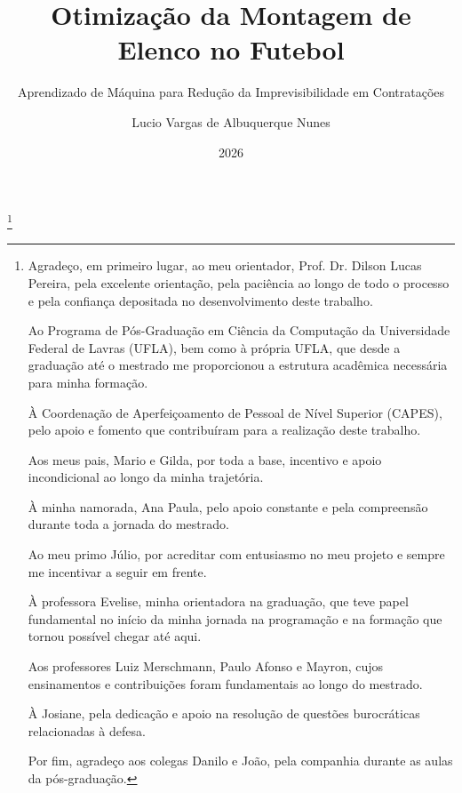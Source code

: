 \documentclass{uflamon}          %
\author{Lucio Vargas de Albuquerque Nunes}
\title{Otimização da Montagem de Elenco no Futebol}
\subtitle{Aprendizado de Máquina para Redução da Imprevisibilidade em Contratações}
\date{2026}
\begin{document}
\maketitle


\thanks{Agradeço, em primeiro lugar, ao meu orientador, Prof. Dr. Dilson Lucas Pereira, pela excelente orientação, pela paciência ao longo de todo o processo e 
pela confiança depositada no desenvolvimento deste trabalho.

Ao Programa de Pós-Graduação em Ciência da Computação da Universidade Federal de Lavras (UFLA), bem como à própria UFLA, que desde a graduação 
até o mestrado me proporcionou a estrutura acadêmica necessária para minha formação.

À Coordenação de Aperfeiçoamento de Pessoal de Nível Superior (CAPES), pelo apoio e fomento que contribuíram para a realização deste trabalho.

Aos meus pais, Mario e Gilda, por toda a base, incentivo e apoio incondicional ao longo da minha trajetória.

À minha namorada, Ana Paula, pelo apoio constante e pela compreensão durante toda a jornada do mestrado.

Ao meu primo Júlio, por acreditar com entusiasmo no meu projeto e sempre me incentivar a seguir em frente.

À professora Evelise, minha orientadora na graduação, que teve papel fundamental no início da minha jornada na programação e na formação que tornou possível chegar até aqui.

Aos professores Luiz Merschmann, Paulo Afonso e Mayron, cujos ensinamentos e contribuições foram fundamentais ao longo do mestrado.

À Josiane, pela dedicação e apoio na resolução de questões burocráticas relacionadas à defesa.

Por fim, agradeço aos colegas Danilo e João, pela companhia durante as aulas da pós-graduação.}         %

\end{document}
